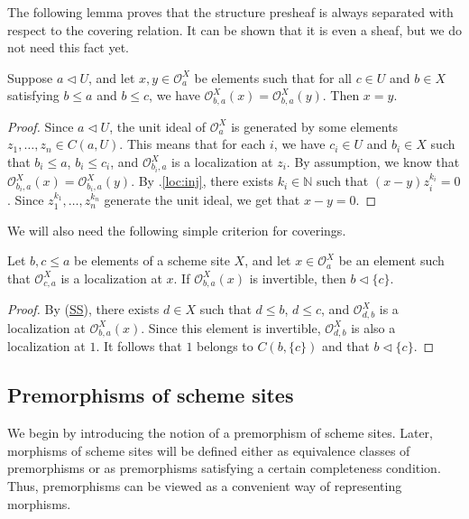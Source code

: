 \documentclass[reqno]{amsart}
\newcommand{\axref}[1]{(\hyperref[ax:#1]{#1})}
\theoremstyle{definition}
\theoremstyle{remark}
\numberwithin{figure}{section}
\newcommand{\cover}{\triangleleft}
\begin{document}
The following lemma proves that the structure presheaf is always separated with respect to the covering relation.
It can be shown that it is even a sheaf, but we do not need this fact yet.

\begin{lem}
Suppose $a \cover U$, and let $x,y \in \mathcal{O}^X_a$ be elements such that for all $c \in U$ and $b \in X$ satisfying $b \leq a$ and $b \leq c$, we have $\mathcal{O}^X_{b,a}(x) = \mathcal{O}^X_{b,a}(y)$.
Then $x = y$.
\end{lem}
\begin{proof}
Since $a \cover U$, the unit ideal of $\mathcal{O}^X_a$ is generated by some elements $z_1, \ldots, z_n \in C(a,U)$.
This means that for each $i$, we have $c_i \in U$ and $b_i \in X$ such that $b_i \leq a$, $b_i \leq c_i$, and $\mathcal{O}^X_{b_i,a}$ is a localization at $z_i$.
By assumption, we know that $\mathcal{O}^X_{b_i,a}(x) = \mathcal{O}^X_{b_i,a}(y)$.
By .\eqref{loc:inj}, there exists $k_i \in \mathbb{N}$ such that $(x - y) z_i^{k_i} = 0$.
Since $z_1^{k_1}, \ldots, z_n^{k_n}$ generate the unit ideal, we get that $x - y = 0$.
\end{proof}

We will also need the following simple criterion for coverings.

\begin{lem}
Let $b,c \leq a$ be elements of a scheme site $X$, and let $x \in \mathcal{O}^X_a$ be an element such that $\mathcal{O}^X_{c,a}$ is a localization at $x$.
If $\mathcal{O}^X_{b,a}(x)$ is invertible, then $b \cover \{ c \}$.
\end{lem}
\begin{proof}
By \axref{SS}, there exists $d \in X$ such that $d \leq b$, $d \leq c$, and $\mathcal{O}^X_{d,b}$ is a localization at $\mathcal{O}^X_{b,a}(x)$.
Since this element is invertible, $\mathcal{O}^X_{d,b}$ is also a localization at $1$.
It follows that $1$ belongs to $C(b, \{ c \})$ and that $b \cover \{ c \}$.
\end{proof}

\subsection{Premorphisms of scheme sites}

We begin by introducing the notion of a premorphism of scheme sites.
Later, morphisms of scheme sites will be defined either as equivalence classes of premorphisms or as premorphisms satisfying a certain completeness condition.
Thus, premorphisms can be viewed as a convenient way of representing morphisms.
\end{document}
